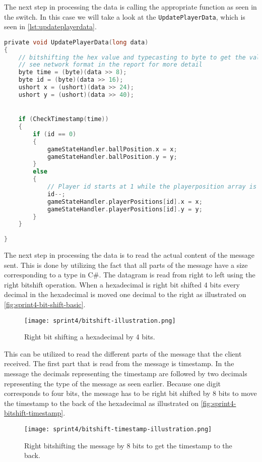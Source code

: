 \noindent 
The next step in processing the data is calling the appropriate function as seen in the switch. 
In this case we will take a look at the \texttt{UpdatePlayerData}, which is seen in \autoref{lst:updateplayerdata}.

\begin{lstlisting}[caption={Updating player data in UDP client}, captionpos=b,language=C,label={lst:updateplayerdata}]
private void UpdatePlayerData(long data)
{
    // bitshifting the hex value and typecasting to byte to get the values.
    // see network format in the report for more detail
    byte time = (byte)(data >> 8);
    byte id = (byte)(data >> 16);
    ushort x = (ushort)(data >> 24);
    ushort y = (ushort)(data >> 40);


    if (CheckTimestamp(time))
    {
        if (id == 0)
        {
            gameStateHandler.ballPosition.x = x;
            gameStateHandler.ballPosition.y = y;
        }
        else
        {
            // Player id starts at 1 while the playerposition array is 0 indexed. Decrementing id so that they line up.
            id--;
            gameStateHandler.playerPositions[id].x = x;
            gameStateHandler.playerPositions[id].y = y;
        }
    }
    
}
\end{lstlisting}
\noindent 
The next step in processing the data is to read the actual content of the message sent.
This is done by utilizing the fact that all parts of the message have a size corresponding to a type in C\#.
The datagram is read from right to left using the right bitshift operation.
When a hexadecimal is right bit shifted 4 bits every decimal in the hexadecimal is moved one decimal to the right as illustrated on \autoref{fig:sprint4-bit-shift-basic}.
\begin{figure}[H]
    \centering
    \texttt{[image: sprint4/bitshift-illustration.png]}
    \caption{Right bit shifting a hexadecimal by 4 bits.}
    \label{fig:sprint4-bit-shift-basic}
\end{figure}
This can be utilized to read the different parts of the message that the client received.
The first part that is read from the message is timestamp.
In the message the decimals representing the timestamp are followed by two decimals representing the type of the message as seen earlier.
Because one digit corresponds to four bits, the message has to be right bit shifted by 8 bits to move the timestamp to the back of the hexadecimal as illustrated on \autoref{fig:sprint4-bitshift-timestamp}.
\begin{figure}[H]
    \centering
    \texttt{[image: sprint4/bitshift-timestamp-illustration.png]}
    \caption{Right bitshifting the message by 8 bits to get the timestamp to the back.}
    \label{fig:sprint4-bitshift-timestamp}
\end{figure}

